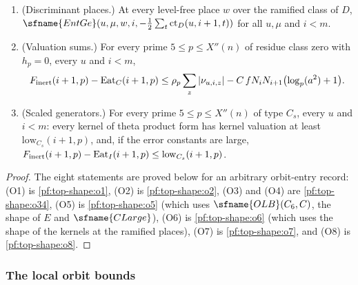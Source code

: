 \begin{theorem}
\begin{enumerate}[label=(O\arabic*)]
\begin{align*}
&+\delta_1n_p\,\mathrm{Nm}^2\log_p(2a)+\delta_2\,\mathrm{tops}(r)\log_p(2a)^2,
\end{align*}
with $\gamma_p=p/(p^2-1)$, $\mathrm{tops}(r)$ the number of top places in the orbit of $r$, $r_s$ its translates and
$\eta,S_c,\mathrm{Nm}$ size parameters.
\item (Discriminant places.) At every level-free place $w$ over the ramified class of $D$,
$\sfname{EntGe}(u,\mu,w,i,-\frac12\sum_t\mathrm{ct}_D(u,i+1,t))$ for all $u,\mu$ and $i<m$.
\item (Valuation sums.) For every prime $5\le p\le X''(n)$ of residue class zero with $h_p=0$, every $u$ and $i<m$,
\[
F_{\rm inert}(i+1,p)-\mathrm{Eat}_C(i+1,p)\le\rho_p\sum_z|\nu_{u,i,z}|-C\,fN_iN_{i+1}\bigl(\log_p(a^2)+1\bigr).
\]
\item (Scaled generators.) For every prime $5\le p\le X''(n)$ of type $C_s$, every $u$ and $i<m$: every kernel of theta
product form has kernel valuation at least $\mathrm{low}_{C_s}(i+1,p)$, and, if the error constants are large,
$F_{\rm inert}(i+1,p)-\mathrm{Eat}_I(i+1,p)\le\mathrm{low}_{C_s}(i+1,p)$.
\end{enumerate}
\end{theorem}

\begin{proof}
The eight statements are proved below for an arbitrary orbit-entry record: (O1) is \cref{pf:top-shape:o1}, (O2) is
\cref{pf:top-shape:o2}, (O3) and (O4) are \cref{pf:top-shape:o34}, (O5) is \cref{pf:top-shape:o5} (which uses
$\sfname{OLB}(C_6,C)$, the shape of $E$ and $\sfname{CLarge}$), (O6) is \cref{pf:top-shape:o6} (which uses the shape of
the kernels at the ramified places), (O7) is \cref{pf:top-shape:o7}, and (O8) is \cref{pf:top-shape:o8}.
\end{proof}

\subsubsection*{The local orbit bounds}

